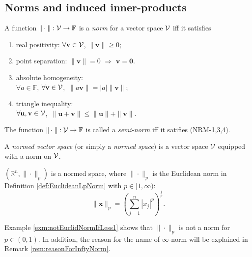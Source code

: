 \subsection{Norms and induced inner-products}
\label{sec:normed-vector-spaces}

\begin{defn}
  \label{def:norm}
  A function $\|\cdot\|: {\cal V}\rightarrow\mathbb{F}$
  is a \emph{norm} for a vector space ${\cal V}$ iff it satisfies
  \begin{enumerate}[(NRM-1)]
    \itemsep0em
  \item real positivity: 
    $\forall \mathbf{v}\in{\cal V}$, 
    $\|\mathbf{v}\| \ge 0$;
  \item point separation:
    $\|\mathbf{v}\|=0$ $\Rightarrow$ $\mathbf{v}=\mathbf{0}$.
  \item absolute homogeneity: \\
    $\forall a\in \mathbb{F}$,
    $\forall \mathbf{v}\in{\cal V}$,\ 
    $\|a\mathbf{v}\|=|a|\|\mathbf{v}\|$;
  \item triangle inequality:\\
    $\forall \mathbf{u},\mathbf{v}\in{\cal V}$,\ 
    $\|\mathbf{u}+\mathbf{v}\|\le\|\mathbf{u}\|+\|\mathbf{v}\|$.
  \end{enumerate}
  The function $\|\cdot\|: {\cal V}\rightarrow\mathbb{F}$
  is called a \emph{semi-norm} iff
  it satifies (NRM-1,3,4).
\end{defn}

\begin{defn}
  \label{def:normedSpace}
  A \emph{normed vector space} (or simply a \emph{normed space})
  is a vector space ${\cal V}$
  equipped with a norm on ${\cal V}$.
\end{defn}

\begin{exm}
  \label{exm:RdEuclideanSpace}
  $\left(\mathbb{R}^n, \|\cdot\|_p\right)$
  is a normed space, 
  where $\|\cdot\|_p$ is the Euclidean norm
  in Definition \ref{def:EuclideanLpNorm}
  with $p\in[1,\infty)$: 
  \begin{displaymath}
    \|\mathbf{x}\|_p= \left(\sum_{j=1}^n |x_j|^p\right)^{\frac{1}{p}}.
  \end{displaymath}
\end{exm}

\begin{rem}
  Example \ref{exm:notEuclidNormIfLess1}
  shows that $\|\cdot\|_p$ is not a norm for $p\in(0,1)$.
  In addition, the reason for the name of $\infty$-norm
  will be explained in Remark \ref{rem:reasonForInftyNorm}.
\end{rem}

